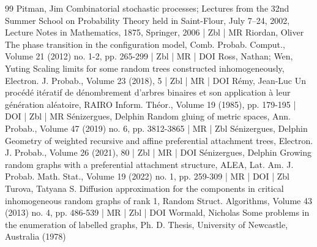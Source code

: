 \begin{thebibliography}{99}
Pitman, Jim Combinatorial stochastic processes; Lectures from the 32nd Summer School on Probability Theory held in Saint-Flour, July 7–24, 2002, Lecture Notes in Mathematics, 1875, Springer, 2006 | Zbl | MR
Riordan, Oliver The phase transition in the configuration model, Comb. Probab. Comput., Volume 21 (2012) no. 1-2, pp. 265-299 | Zbl | MR | DOI
Ross, Nathan; Wen, Yuting Scaling limits for some random trees constructed inhomogeneously, Electron. J. Probab., Volume 23 (2018), 5 | Zbl | MR | DOI
Rémy, Jean-Luc Un procédé itératif de dénombrement d’arbres binaires et son application à leur génération aléatoire, RAIRO Inform. Théor., Volume 19 (1985), pp. 179-195 | DOI | Zbl | MR
Sénizergues, Delphin Random gluing of metric spaces, Ann. Probab., Volume 47 (2019) no. 6, pp. 3812-3865 | MR | Zbl
Sénizergues, Delphin Geometry of weighted recursive and affine preferential attachment trees, Electron. J. Probab., Volume 26 (2021), 80 | Zbl | MR | DOI
Sénizergues, Delphin Growing random graphs with a preferential attachment structure, ALEA, Lat. Am. J. Probab. Math. Stat., Volume 19 (2022) no. 1, pp. 259-309 | MR | DOI | Zbl
Turova, Tatyana S. Diffusion approximation for the components in critical inhomogeneous random graphs of rank 1, Random Struct. Algorithms, Volume 43 (2013) no. 4, pp. 486-539 | MR | Zbl | DOI
Wormald, Nicholas Some problems in the enumeration of labelled graphs, Ph. D. Thesis, University of Newcastle, Australia (1978)
\end{thebibliography}
